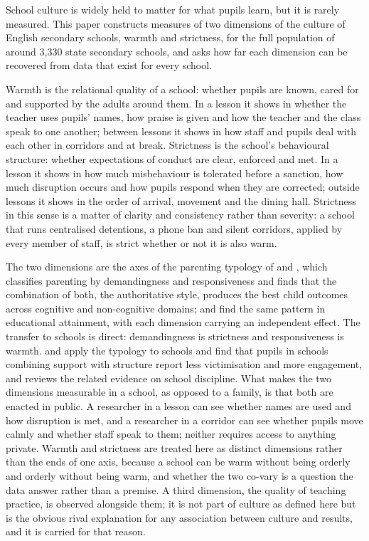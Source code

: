 School culture is widely held to matter for what pupils learn, but it is
rarely measured. This paper constructs measures of two dimensions of the
culture of English secondary schools, warmth and strictness, for the full
population of around 3,330 state secondary schools, and asks how far each
dimension can be recovered from data that exist for every school.

Warmth is the relational quality of a school: whether pupils are known,
cared for and supported by the adults around them. In a lesson it shows in
whether the teacher uses pupils' names, how praise is given and how the
teacher and the class speak to one another; between lessons it shows in how
staff and pupils deal with each other in corridors and at break. Strictness is
the school's behavioural structure: whether expectations of conduct are clear,
enforced and met. In a lesson it shows in how much misbehaviour is tolerated
before a sanction, how much disruption occurs and how pupils respond when they
are corrected; outside lessons it shows in the order of arrival, movement and
the dining hall. Strictness in this sense is a matter of clarity and
consistency rather than severity: a school that runs centralised detentions,
a phone ban and silent corridors, applied by every member of staff, is strict
whether or not it is also warm.

The two dimensions are the axes of the parenting typology of
\citet{baumrind1971} and \citet{maccoby1983}, which classifies parenting by
demandingness and responsiveness and finds that the combination of both, the
authoritative style, produces the best child outcomes across cognitive and
non-cognitive domains; \citet{majumder2015} and \citet{zhang2020} find the
same pattern in educational attainment, with each dimension carrying an
independent effect. The transfer to schools is direct: demandingness is
strictness and responsiveness is warmth. \citet{pellerin2005} and
\citet{gregory2010,gregory2011} apply the typology to schools and find that
pupils in schools combining support with structure report less victimisation
and more engagement, and \citet{gottfredson2005} reviews the related evidence
on school discipline. What makes the two dimensions measurable in a school,
as opposed to a family, is that both are enacted in public. A researcher in a
lesson can see whether names are used and how disruption is met, and a
researcher in a corridor can see whether pupils move calmly and whether staff
speak to them; neither requires access to anything private. Warmth and
strictness are treated here as distinct dimensions rather than the ends of one
axis, because a school can be warm without being orderly and orderly without
being warm, and whether the two co-vary is a question the data answer rather
than a premise. A third dimension, the quality of teaching practice, is
observed alongside them; it is not part of culture as defined here but is the
obvious rival explanation for any association between culture and results,
and it is carried for that reason.

